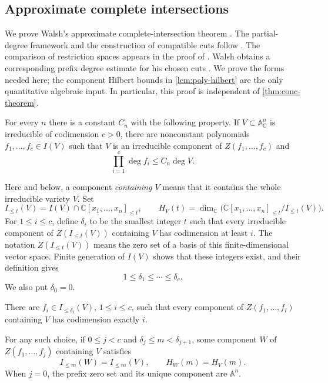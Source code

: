 \subsection{Approximate complete intersections}
\label{subsec:aci-section}

We prove Walsh's approximate complete-intersection theorem \cite[Theorem~1.3]{walsh2020}. The partial-degree framework and the construction of compatible cuts follow \cite[Definition~2.2 and Lemma~5.3]{walsh2020}. The comparison of restriction spaces appears in the proof of \cite[Lemma~3.5]{walsh2020}. Walsh obtains a corresponding prefix degree estimate for his chosen cuts \cite[Theorem~5.5]{walsh2020}. We prove the forms needed here; the component Hilbert bounds in \cref{lem:poly-hilbert} are the only quantitative algebraic input. In particular, this proof is independent of \cref{thm:conc-theorem}.

\begin{theorem}
\label{thm:aci-theorem}
\label{conc:walsh}
For every $n$ there is a constant $C_n$ with the following property. If $V\subset\mathbb{A}^n_{\mathbb{C}}$ is irreducible of codimension $c>0$, there are nonconstant polynomials $f_1,\ldots,f_c\in I(V)$ such that $V$ is an irreducible component of $Z(f_1,\ldots,f_c)$ and
\[
 \prod_{i=1}^c\deg f_i\le C_n\deg V.
\]
\end{theorem}

Here and below, a component \emph{containing $V$} means that it contains the whole irreducible variety $V$.  Set
\[
 I_{\le t}(V)=I(V)\cap\mathbb{C}[x_1,\ldots,x_n]_{\le t},
 \qquad
 H_V(t)=\dim_{\mathbb{C}}
 \bigl(\mathbb{C}[x_1,\ldots,x_n]_{\le t}/I_{\le t}(V)\bigr).
\]
For $1\le i\le c$, define $\delta_i$ to be the smallest integer $t$ such that every irreducible component of $Z(I_{\le t}(V))$ containing $V$ has codimension at least $i$.  The notation $Z(I_{\le t}(V))$ means the zero set of a basis of this finite-dimensional vector space. Finite generation of $I(V)$ shows that these integers exist, and their definition gives
\begin{equation}
 1\le\delta_1\le\cdots\le\delta_c.
 \label{eq:aci-partial-degrees}
\end{equation}
We also put $\delta_0=0$.

\begin{lemma}
\label{lem:aci-cuts}
There are $f_i\in I_{\le\delta_i}(V)$, $1\le i\le c$, such that every component of $Z(f_1,\ldots,f_i)$ containing $V$ has codimension exactly $i$.

For any such choice, if $0\le j<c$ and $\delta_j\le m<\delta_{j+1}$, some component $W$ of $Z(f_1,\ldots,f_j)$ containing $V$ satisfies
\begin{equation}
 I_{\le m}(W)=I_{\le m}(V),\qquad H_W(m)=H_V(m).
 \label{eq:aci-shared-rank}
\end{equation}
When $j=0$, the prefix zero set and its unique component are $\mathbb{A}^n$.
\end{lemma}

